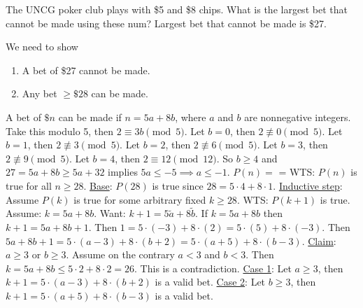 \documentclass[]{article}
\begin{document}
\begin{example}
	The UNCG poker club plays with \$5 and \$8 chips. What is the largest bet that cannot be made using these num? Largest bet that cannot be made is \$27.
	
	We need to show
	\begin{enumerate}
		\item A bet of \$27 cannot be made.
		\item Any bet $\geq \$28$ can be made.
	\end{enumerate}
	A bet of $\$n$ can be made if $n=5a+8b$, where $a$ and $b$ are nonnegative integers. Take this modulo 5, then $2\equiv 3b\pmod5$. Let $b=0$, then $2\not\equiv 0\pmod5$. Let $b=1$, then $2\not\equiv 3\pmod 5$. Let $b=2$, then $2\not\equiv 6\pmod5$. Let $b = 3$, then $2\not\equiv 9\pmod5$. Let $b=4$, then $2\equiv 12\pmod 12$. So $b\geq 4$ and $27 = 5a + 8b\geq 5a+32$ implies $5a\leq -5\implies a\leq -1$. $P(n) = $  =  WTS: $P(n)$ is true for all $n\geq 28$.
	\ul{Base}: $P(28)$ is true since $28 = 5\cdot 4 + 8\cdot 1$.
	\ul{Inductive step}: Assume $P(k)$ is true for some arbitrary fixed $k\geq 28$. WTS: $P(k+1)$ is true. Assume: $k=5a+8b$. Want: $k+1 = 5\tilde a + 8\tilde b$. If $k = 5a+8b$ then $k+1 = 5a+8b+1$. Then $1 = 5\cdot(-3) + 8\cdot(2) = 5\cdot(5) + 8\cdot(-3)$. Then $5a+8b +1 = 5\cdot(a-3) + 8\cdot(b+2) = 5\cdot(a+5) + 8\cdot(b-3)$.
	\ul{Claim}: $a \geq 3$ or $b\geq 3$. Assume on the contrary $a<3$ and $b<3$. Then $k = 5a+8b \leq 5\cdot 2 + 8\cdot 2 = 26$. This is a contradiction.
	\ul{Case 1}: Let $a\geq 3$, then $k+1 = 5\cdot(a-3) + 8\cdot(b+2)$ is a valid bet.
	\ul{Case 2}: Let $b\geq 3$, then $k+1 = 5\cdot (a+5) + 8\cdot(b-3)$ is a valid bet.
\end{example}
\end{document}

